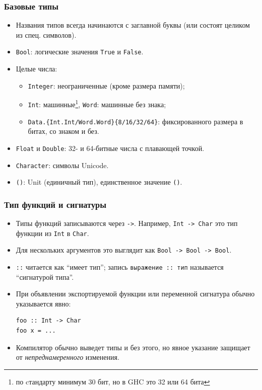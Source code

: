 \documentclass[12pt]{beamer}
\begin{document}
\begin{frame}[fragile]
\frametitle{Базовые типы}
\begin{itemize}
    \item Названия типов всегда начинаются с заглавной буквы (или состоят целиком из спец. символов).
    \item \lstinline|Bool|: логические значения \lstinline|True| и \lstinline|False|.
    \item Целые числа:
    \begin{itemize}
        \item \footnotesize \lstinline|Integer|: неограниченные (кроме размера памяти);
        \item \footnotesize \lstinline|Int|: машинные\footnote{по cтандарту минимум 30 бит, но в GHC это 32 или 64 бита}, \lstinline|Word|: машинные без знака;
        \item \footnotesize \lstinline|Data.{Int.Int/Word.Word}{8/16/32/64}|: фиксированного размера в битах, со знаком и без.
    \end{itemize}
    \item \lstinline|Float| и \lstinline|Double|: 32- и 64-битные числа с плавающей точкой.
    \item \lstinline|Character|: символы Unicode.
    \item \lstinline|()|: Unit (единичный тип), единственное значение \lstinline|()|.
\end{itemize}
\end{frame}

\endgroup

\begin{frame}[fragile]
\frametitle{Тип функций и сигнатуры}
\begin{itemize}
    \item Типы функций записываются через \lstinline|->|. Например, \lstinline|Int -> Char| это тип функции из \lstinline|Int| в \lstinline|Char|.
    
    \item Для нескольких аргументов это выглядит как \pause\lstinline|Bool -> Bool -> Bool|.
    
    \item \lstinline|::| читается как \enquote{имеет тип}; запись \lstinline|выражение :: тип| называется \enquote{сигнатурой типа}.
    
    \item При объявлении экспортируемой функции или переменной  сигнатура обычно указывается явно:
\begin{lstlisting}
foo :: Int -> Char
foo x = ...
\end{lstlisting}
    \item Компилятор обычно выведет типы и без этого, но явное указание защищает от \emph{непреднамеренного} изменения.
\end{itemize}
\end{frame}
\end{document}
